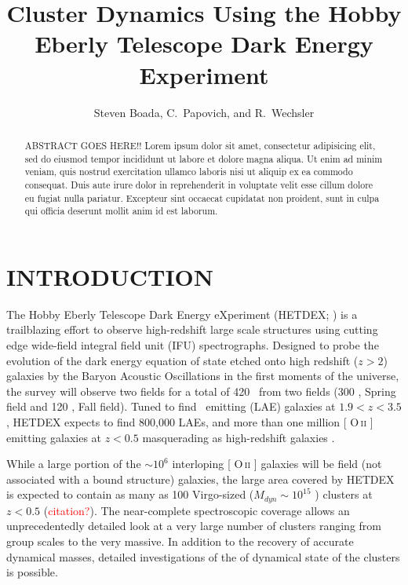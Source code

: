 \documentclass[apj, revtex4]{emulateapj}
\makeatletter
\newcommand{\editorial}[1]{\textcolor{red}{#1}}
\DeclareRobustCommand{\ion}[2]{%
\relax\ifmmode
\ifx\testbx\f@series
{\mathbf{#1\,\mathsc{#2}}}\else
{\mathrm{#1\,\mathsc{#2}}}\fi
\else\textup{#1\,{\mdseries\textsc{#2}}}%
\fi}
\makeatother
\begin{document}
\title{Cluster Dynamics Using the Hobby Eberly Telescope Dark Energy Experiment}

\author{\sc Steven Boada, 
C.~Papovich, and
R.~Wechsler} 


\begin{abstract}
\noindent
ABSTRACT GOES HERE!!
Lorem ipsum dolor sit amet, consectetur adipisicing elit, sed do eiusmod tempor incididunt ut labore et dolore magna aliqua. Ut enim ad minim veniam, quis nostrud exercitation ullamco laboris nisi ut aliquip ex ea commodo consequat. Duis aute irure dolor in reprehenderit in voluptate velit esse cillum dolore eu fugiat nulla pariatur. Excepteur sint occaecat cupidatat non proident, sunt in culpa qui officia deserunt mollit anim id est laborum.
\end{abstract}

\section{INTRODUCTION}
The Hobby Eberly Telescope Dark Energy eXperiment (HETDEX; \citealt{Hill2008}) is a trailblazing effort to observe high-redshift large scale structures using cutting edge wide-field integral field unit (IFU) spectrographs. Designed to probe the evolution of the dark energy equation of state etched onto high redshift ($z>2$) galaxies by the Baryon Acoustic Oscillations \citep{Eisenstein2005} in the first moments of the universe, the survey will observe two fields for a total of 420 \degsq\ from two fields (300 \degsq, Spring field and 120 \degsq, Fall field). Tuned to find \lya\ emitting (LAE) galaxies at $1.9<z<3.5$, HETDEX expects to find 800,000 LAEs, and more than one million [\ion{O}{ii}] emitting galaxies at $z<0.5$ masquerading as high-redshift galaxies \citep{Acquaviva2014}.  

While a large portion of the $\sim10^6$ interloping [\ion{O}{ii}] galaxies will be field (not associated with a bound structure) galaxies, the large area covered by HETDEX is expected to contain as many as 100 Virgo-sized ($M_{dyn}\sim 10^{15}$ \msol) clusters at $z<0.5$ (\editorial{citation?}). The near-complete spectroscopic coverage allows an unprecedentedly detailed look at a very large number of clusters ranging from group scales to the very massive. In addition to the recovery of accurate dynamical masses, detailed investigations of the of dynamical state of the clusters is possible. 
\end{document}
